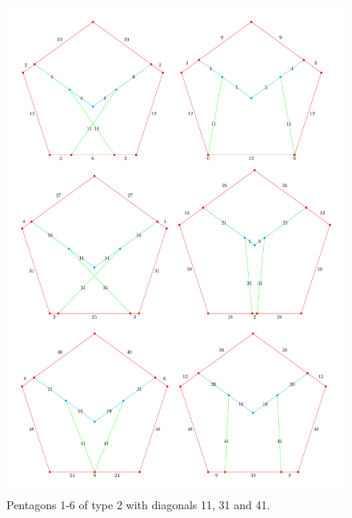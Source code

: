 \documentclass[11pt]{article}
\begin{document}
\begin{figure}
\centering
\includegraphics[width=16cm]{types/2gen}
\caption{Pentagons 1-6 of type 2 with diagonals 11, 31 and 41.}
\label{2gen}
\end{figure}
\end{document}
